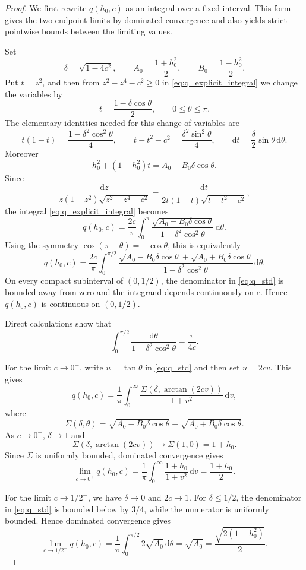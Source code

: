 \documentclass[a4paper,11pt]{amsart}
\numberwithin{equation}{section}
\theoremstyle{plain}
\newcommand{\dif}{\mathrm{d}}
\begin{document}
\begin{proof}
We first rewrite $q(h_0,c)$ as an integral over a fixed interval. This
form gives the two endpoint limits by dominated convergence and also yields
strict pointwise bounds between the limiting values.

Set
\[
\delta=\sqrt{1-4c^2},\qquad
A_0=\frac{1+h_0^2}{2},\qquad
B_0=\frac{1-h_0^2}{2}.
\]
Put $t=z^2$, and then from $z^2-z^4-c^2\geq0$ in \eqref{eq:q_explicit_integral} we change the variables by
\[
t=\frac{1-\delta\cos\theta}{2},\qquad 0\le\theta\le\pi.
\]
The elementary identities needed for this change of variables are
\[
    t(1-t)=\frac{1-\delta^2\cos^2\theta}{4},
    \qquad
    t-t^2-c^2=\frac{\delta^2\sin^2\theta}{4},
    \qquad
    \dif t=\frac{\delta}{2}\sin\theta\,\dif\theta.
\]
Moreover
\[
    h_0^2+(1-h_0^2)t=A_0-B_0\delta\cos\theta.
\]
Since
\[
    \frac{\dif z}{z(1-z^2)\sqrt{z^2-z^4-c^2}}
    =
    \frac{\dif t}{2t(1-t)\sqrt{t-t^2-c^2}},
\]
the integral \eqref{eq:q_explicit_integral}  becomes
\[
q(h_0,c)=
\frac{2c}{\pi}
\int_0^\pi
\frac{\sqrt{A_0-B_0\delta\cos\theta}}
{1-\delta^2\cos^2\theta}
\,\dif\theta.
\]
Using the symmetry $\cos(\pi-\theta)=-\cos\theta$, this is equivalently
\begin{equation}\label{eq:q_std}
q(h_0,c)
=
\frac{2c}{\pi}
\int_0^{\pi/2}
\frac{
\sqrt{A_0-B_0\delta\cos\theta}
+
\sqrt{A_0+B_0\delta\cos\theta}
}
{1-\delta^2\cos^2\theta}
\,\dif\theta.
\end{equation}
On every compact subinterval of $(0,1/2)$, the denominator in
\eqref{eq:q_std} is bounded away from zero and the integrand depends
continuously on $c$. Hence $q(h_0,c)$ is continuous on $(0,1/2)$.

Direct calculations show that
\begin{equation}\label{eq:int_aux}
\int_0^{\pi/2}
\frac{\dif\theta}{1-\delta^2\cos^2\theta}
=
\frac{\pi}{4c}.
\end{equation}


For the limit $c\to0^+$, write $u=\tan\theta$ in
\eqref{eq:q_std} and then set $u=2cv$. This gives
\[
q(h_0,c)
=
\frac1\pi
\int_0^\infty
\frac{
\Sigma(\delta,\arctan(2cv))
}
{1+v^2}\,\dif v,
\]
where
\[
\Sigma(\delta,\theta)
=
\sqrt{A_0-B_0\delta\cos\theta}
+
\sqrt{A_0+B_0\delta\cos\theta}.
\]
As $c\to0^+$, $\delta\to1$ and
\[
\Sigma(\delta,\arctan(2cv))\to \Sigma(1,0)=1+h_0.
\]
Since $\Sigma$ is uniformly bounded, dominated convergence gives
\[
\lim_{c\to0^+}q(h_0,c)
=
\frac1\pi
\int_0^\infty
\frac{1+h_0}{1+v^2}\,\dif v
=
\frac{1+h_0}{2}.
\]

For the limit $c\to1/2^-$, we have $\delta\to0$ and $2c\to1$.
For $\delta\leq1/2$, the denominator in \eqref{eq:q_std} is bounded
below by $3/4$, while the numerator is uniformly bounded. Hence dominated
convergence gives
\[
\lim_{c\to1/2^-}q(h_0,c)
=
\frac1\pi
\int_0^{\pi/2}2\sqrt{A_0}\,\dif\theta
=
\sqrt{A_0}
=
\frac{\sqrt{2(1+h_0^2)}}{2}.
\]


\end{proof}
\end{document}
